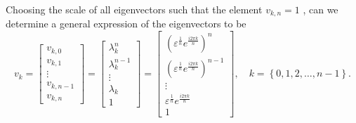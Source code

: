 \documentclass{article}
\theoremstyle{remark}
\begin{document}
    Choosing the scale of all eigenvectors such that the element $v_{k,n} = 1$ , can we determine a general expression of the eigenvectors to be \[
    v_k=  \begin{bmatrix} 
      v_{k,0} \\
      v_{k,1} \\
      \vdots  \\
      v_{k,n-1} \\
      v_{k,n} 
      \end{bmatrix} 
      = \begin{bmatrix} 
        \lambda_k ^{n} \\
        \lambda_k ^{n-1} \\
        \vdots  \\
        \lambda _k \\
        1
      \end{bmatrix} 
      = \begin{bmatrix} 
      \left( \varepsilon ^{\frac{1}{n}} e^{\frac{i 2 \pi k}{n} } \right)^{n} \\
      \left( \varepsilon ^{\frac{1}{n}} e^{\frac{i 2 \pi k}{n} } \right)^{n-1} \\
      \vdots \\
\varepsilon ^{\frac{1}{n}} e^{\frac{i 2 \pi k}{n} } \\
      1
      \end{bmatrix} 
      ,\quad k = \left\{ 0, 1,2, \ldots, n-1 \right\} .
    \] 
\end{document}
